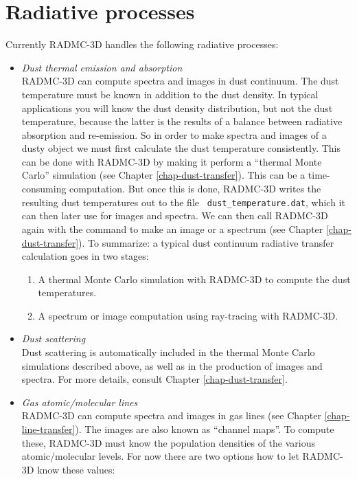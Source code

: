\documentclass{report}
\begin{document}
\section{Radiative processes}
\label{sec-rad-processes}
%
Currently RADMC-3D handles the following radiative processes:
\begin{itemize}
\item {\em Dust thermal emission and absorption}\\
  RADMC-3D can compute spectra and images in dust continuum. The dust
  temperature must be known in addition to the dust density. In typical
  applications you will know the dust density distribution, but not the dust
  temperature, because the latter is the results of a balance between
  radiative absorption and re-emission. So in order to make spectra and
  images of a dusty object we must first calculate the dust temperature
  consistently. This can be done with RADMC-3D by making it perform a
  ``thermal Monte Carlo'' simulation (see Chapter \ref{chap-dust-transfer}).
  This can be a time-consuming computation. But once this is done, RADMC-3D
  writes the resulting dust temperatures out to the file {\small\tt
    dust\_temperature.dat}, which it can then later use for images and
  spectra. We can then call RADMC-3D again with the command to make an image
  or a spectrum (see Chapter \ref{chap-dust-transfer}). To summarize: a
  typical dust continuum radiative transfer calculation goes in two stages:
  \begin{enumerate}
  \item A thermal Monte Carlo simulation with RADMC-3D to compute the dust
    temperatures.
    \item A spectrum or image computation using ray-tracing with RADMC-3D.
  \end{enumerate}
\item {\em Dust scattering}\\
  Dust scattering is automatically included in the thermal Monte Carlo
  simulations described above, as well as in the production of images and
  spectra. For more details, consult Chapter \ref{chap-dust-transfer}.
\item {\em Gas atomic/molecular lines}\\
  RADMC-3D can compute spectra and images in gas lines (see Chapter
  \ref{chap-line-transfer}). The images are also known as ``channel
  maps''. To compute these, RADMC-3D must know the population densities of
  the various atomic/molecular levels. For now there are two options how to
  let RADMC-3D know these values:

\end{itemize}
\end{document}
